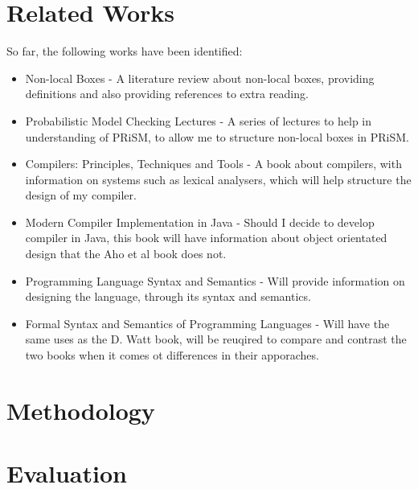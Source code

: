 \documentclass[11pt, a4paper]{article}
\begin{document}

\section{Related Works} %
\label{sec:related_works}
So far, the following works have been identified:
\begin{itemize}
    \item Non-local Boxes\cite{nlb_lamontague} - A literature review about
    non-local boxes, providing definitions and also providing references to
    extra reading.
    \item Probabilistic Model Checking Lectures\cite{prism_lectures} - A series
    of lectures to help in understanding of PRiSM, to allow me to structure
    non-local boxes in PRiSM.
    \item Compilers: Principles, Techniques and Tools\cite{dragon_compiler} - A
    book about compilers, with information on systems such as lexical analysers,
    which will help structure the design of my compiler.
    \item Modern Compiler Implementation in Java\cite{java_compiler} - Should I
    decide to develop compiler in Java, this book will have information about
    object orientated design that the Aho et al book does not.
    \item Programming Language Syntax and Semantics\cite{plss} - Will provide
    information on designing the language, through its syntax and semantics.
    \item Formal Syntax and Semantics of Programming Languages\cite{fsspl} -
    Will have the same uses as the D. Watt book, will be reuqired to compare and
    contrast the two books when it comes ot differences in their apporaches.
\end{itemize}


\section{Methodology} %
\label{sec:methodology}


\section{Evaluation} %
\label{sec:evaluation}

\end{document}
